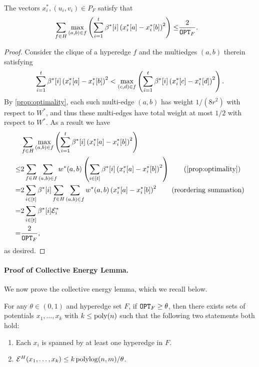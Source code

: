 \documentclass{article}
\begin{document}
\begin{corollary}
\label{cor:opt}
    The vectors $x_{i}^{*}, (u_i,v_i)\in P_F$ satisfy that
    \begin{align}
        \sum_{f\in H}
        \max_{(a,b)\in f}
        \left( \sum_{i=1}^{t} \beta^*[i] \left(x_{i}^{*}[a] - x_{i}^{*}[b]\right)^2 \right)
        \leq & \frac{2}{\mathtt{OPT}_F}.
    \end{align}
\end{corollary}
\begin{proof}
    Consider the clique of a hyperedge $f$
    and
    the multiedges $(a,b)$ therein satisfying
    \begin{align*}
        \sum_{i=1}^{t} \beta^*[i] \left(x_{i}^{*}[a] - x_{i}^{*}[b]\right)^2
        <
        \max_{(c,d)\in f}
        \left( \sum_{i=1}^{t} \beta^*[i] \left(x_{i}^{*}[c] - x_{i}^{*}[d]\right)^2 \right).
    \end{align*}
    By \cref{prop:optimality},
    each such multi-edge $(a,b)$ has weight $1/(8r^2)$ with respect to $W^*$,
    and thus these multi-edges have total weight at most $1/2$ with respect to $W^*$.
    As a result we have
    \begin{align}
        & \sum_{f\in H}
        \max_{(a,b)\in f}
        \kh{ \sum_{i=1}^{t} \beta^*[i] \kh{x_{i}^{*}[a] - x_{i}^{*}[b]}^2 } \notag \\
        \leq & 2 \sum_{f\in H}
        \sum_{(a,b)\in f}
        w^*(a,b)
        \kh{ \sum_{i\in[t]} \beta^*[i] \kh{x_{i}^{*}[a] - x_{i}^{*}[b]}^2 }
        \qquad \text{\rm (\cref{prop:optimality})}
        \notag \\
        = & 2 \sum_{i\in [t]} \beta^*[i] \sum_{f\in H}
        \sum_{(a,b)\in f}
        w^*(a,b)
        \kh{x_{i}^{*}[a] - x_{i}^{*}[b]}^2
        \qquad \text{\rm (reordering summation)} \notag \\
        = & 2 \sum_{i\in[t]} \beta^*[i] \Ecal^{*}_{i} \notag \\
        = & \frac{2}{\OPT_F},
    \end{align}
    as desired.
\end{proof}

\paragraph{Proof of Collective Energy Lemma.}

We now prove the collective energy lemma, which we recall below.

\begin{lemma}
    For any $\theta\in(0,1)$
    and hyperedge set $F$,
    if $\mathtt{OPT}_F \geq \theta$,
    then
    there exists sets of potentials $x_1,\ldots,x_k$
    with $k\leq\mathrm{poly}(n)$
    such that
    the following two statements both hold:
    \begin{enumerate}
        \item Each $x_i$ is spanned by at least one hyperedge in $F$.
        \item $\mathcal{E}^H(x_1,\ldots,x_k) \leq k \operatorname{polylog}(n,m) / \theta$.
    \end{enumerate}
\end{lemma}
\end{document}
